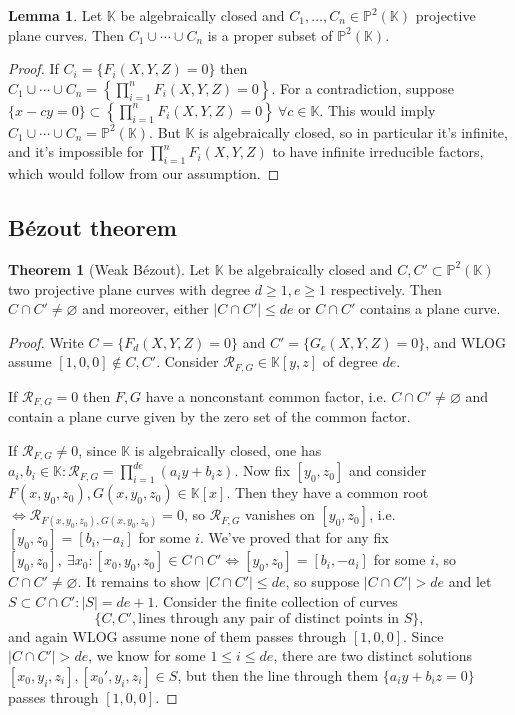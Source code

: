 \documentclass{article}
\newcommand{\K}{\mathbb{K}}
\newcommand{\p}{\mathbb{P}}
\newcommand{\re}{\mathcal{R}}
\theoremstyle{definition}
\newtheorem{thm}[defn]{Theorem}
\newtheorem{lemma}[defn]{Lemma}
\begin{document}
\begin{lemma}
Let $\K$ be algebraically closed and $C_1,\ldots,C_n\in\p^2(\K)$ projective plane curves. Then $C_1\cup\cdots\cup C_n$ is a proper subset of $\p^2(\K)$.
\end{lemma}
\begin{proof}
If $C_i=\{F_i(X,Y,Z)=0\}$ then $C_1\cup\cdots\cup C_n=\left\{\prod_{i=1}^n F_i(X,Y,Z)=0\right\}$. For a contradiction, suppose $\{x-cy=0\}\subset \left\{\prod_{i=1}^n F_i(X,Y,Z)=0\right\} \ \forall c\in\K$. This would imply $C_1\cup\cdots\cup C_n=\p^2(\K)$. But $\K$ is algebraically closed, so in particular it's infinite, and it's impossible for $\prod_{i=1}^n F_i(X,Y,Z)$ to have infinite irreducible factors, which would follow from our assumption.
\end{proof}

\subsection{Bézout theorem}
\begin{thm}[Weak Bézout]
Let $\K$ be algebraically closed and $C,C'\subset\p^2(\K)$ two projective plane curves with degree $d\geq 1,e\geq 1$ respectively. Then $C\cap C'\neq\varnothing$ and moreover, either $|C\cap C'|\leq de$ or $C\cap C'$ contains a plane curve.
\end{thm}
\begin{proof}
Write $C=\{F_d(X,Y,Z)=0\}$ and $C'=\{G_e(X,Y,Z)=0\}$, and WLOG assume $[1,0,0]\notin C,C'$. Consider $\re_{F,G}\in\K[y,z]$ of degree $de$.

If $\re_{F,G}=0$ then $F,G$ have a nonconstant common factor, i.e. $C\cap C'\neq\varnothing$ and contain a plane curve given by the zero set of the common factor.

If $\re_{F,G}\neq 0$, since $\K$ is algebraically closed, one has $a_i,b_i\in\K:\re_{F,G}=\prod_{i=1}^{de}(a_iy+b_iz)$. Now fix $[y_0,z_0]$ and consider $F(x,y_0,z_0),G(x,y_0,z_0)\in\K[x]$. Then they have a common root $\iff\re_{F(x,y_0,z_0),G(x,y_0,z_0)}=0$, so $\re_{F,G}$ vanishes on $[y_0,z_0]$, i.e. $[y_0,z_0]=[b_i,-a_i]$ for some $i$. We've proved that for any fix $[y_0,z_0],\ \exists x_0:[x_0,y_0,z_0]\in C\cap C'\iff [y_0,z_0]=[b_i,-a_i]$ for some $i$, so $C\cap C'\neq\varnothing$. It remains to show $|C\cap C'|\leq de$, so suppose $|C\cap C'|>de$ and let $S\subset C\cap C':|S|=de+1$. Consider the finite collection of curves
\[
\{C,C',\text{lines through any pair of distinct points in }S\},
\]
and again WLOG assume none of them passes through $[1,0,0]$. Since $|C\cap C'|>de$, we know for some $1\leq i\leq de$, there are two distinct solutions $[x_0,y_i,z_i],[x_0',y_i,z_i]\in S$, but then the line through them $\{a_iy+b_iz=0\}$ passes through $[1,0,0]$.
\end{proof}
\end{document}
